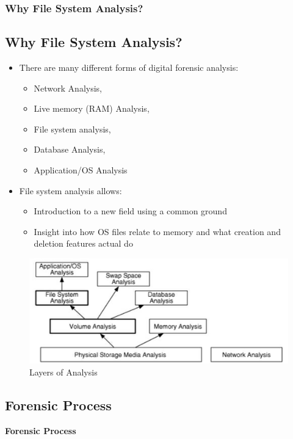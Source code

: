 \documentclass{beamer}
\begin{document}
\begin{frame}[allowframebreaks]
	\frametitle{Why File System Analysis?}
	\subsection*{Why File System Analysis?}
	\begin{itemize}
		\item There are many different forms of digital forensic analysis:
			\begin{itemize}
				\item Network Analysis,
				\item Live memory (RAM) Analysis, 
				\item File system analysis, 
				\item Database Analysis,
				\item Application/OS Analysis
			\end{itemize}
			\item File system analysis allows:
			\begin{itemize}
				\item Introduction to a new field using a common ground
				\item Insight into how OS files relate to memory and what creation and deletion features actual do
			\end{itemize}
	\end{itemize}
	\begin{figure}
		\includegraphics[scale=0.3]{digital-data-analysis-layers-BrianCarrier}
		\caption{Layers of Analysis}
	\end{figure}
\end{frame}

\begin{frame}%
	\section{Forensic Process}
	\begin{center}
		\Huge\textbf{Forensic Process}
	\end{center}
\end{frame}
\end{document}
